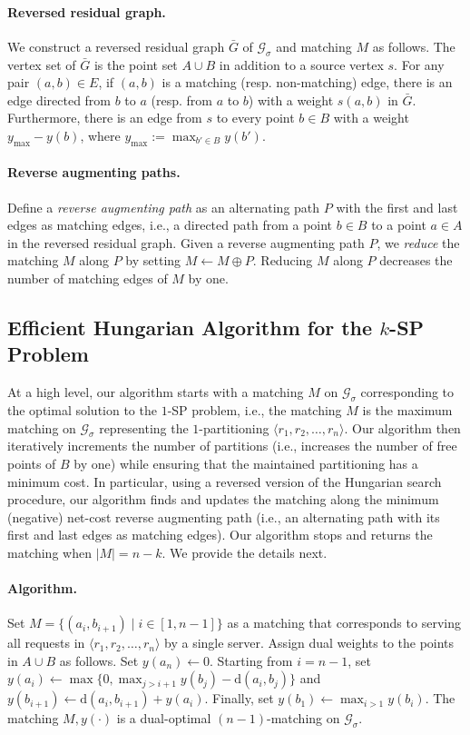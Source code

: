 \documentclass[11pt,onecolumn]{article}
\def\mcG{{\mathcal{G}}}
\newcommand{\distance}[2]{\mathrm{d}(#1, #2)}
\newcommand{\requests}{\sigma}
\newcommand\myparagraph[1]{\paragraph{#1}}
\begin{document}
\myparagraph{Reversed residual graph.} We construct a reversed residual graph $\bar{G}$ of $\mcG_\requests$ and matching $M$ as follows. The vertex set of $\bar{G}$ is the point set $A\cup B$ in addition to a source vertex $s$. For any pair $(a,b)\in E$, if $(a,b)$ is a matching (resp. non-matching) edge, there is an edge directed from $b$ to $a$ (resp. from $a$ to $b$) with a weight $s(a,b)$ in $\bar{G}$. Furthermore, there is an edge from $s$ to every point $b\in B$ with a weight $y_{\max} - y(b)$, where $y_{\max}:=\max_{b'\in B} y(b')$. 

\myparagraph{Reverse augmenting paths.}Define a \emph{reverse augmenting path} as an alternating path $P$ with the first and last edges as matching edges, i.e., a directed path from a point $b\in B$ to a point $a\in A$ in the reversed residual graph. Given a reverse augmenting path $P$, we \emph{reduce} the matching $M$ along $P$ by setting $M\leftarrow M\oplus P$. Reducing $M$ along $P$ decreases the number of matching edges of $M$ by one.


\subsection{Efficient Hungarian Algorithm for the \texorpdfstring{$k$}{}-SP Problem}\label{sec:hungarian_n2k_ksp}
%

At a high level, our algorithm starts with a matching $M$ on $\mcG_\requests$ corresponding to the optimal solution to the $1$-SP problem, i.e., the matching $M$ is the maximum matching on $\mcG_\requests$ representing the $1$-partitioning $\langle r_1, r_2,\ldots, r_n\rangle$. Our algorithm then iteratively increments the number of partitions (i.e., increases the number of free points of $B$ by one) while ensuring that the maintained partitioning has a minimum cost. In particular, using a reversed version of the Hungarian search procedure, our algorithm finds and updates the matching along the minimum (negative) net-cost reverse augmenting path (i.e., an alternating path with its first and last edges as matching edges). Our algorithm stops and returns the matching when $|M|=n-k$. We provide the details next.


\myparagraph{Algorithm.} Set $M= \{(a_i, b_{i+1})\mid i\in[1, n-1]\}$ as a matching that corresponds to serving all requests in $\langle r_1, r_2,\ldots, r_n\rangle$ by a single server. Assign dual weights to the points in $A\cup B$ as follows. Set $y(a_n)\leftarrow 0$. Starting from $i=n-1$, set $y(a_{i})\leftarrow\max\{0, \max_{j>i+1}y(b_j)-\distance{a_{i}}{b_j}\}$ and $y(b_{i+1})\leftarrow\distance{a_{i}}{b_{i+1}} + y(a_{i})$. Finally, set $y(b_1)\leftarrow \max_{i>1}y(b_i)$. The matching $M, y(\cdot)$ is a dual-optimal $(n-1)$-matching on $\mcG_\requests$.
\end{document}
